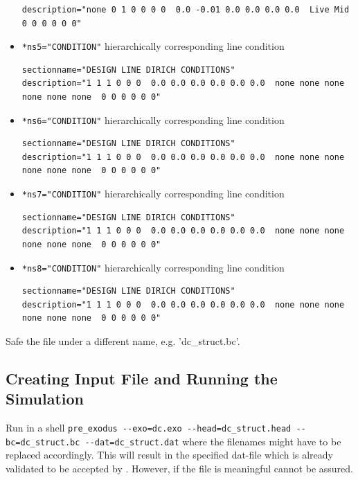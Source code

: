 \begin{itemize}
\begin{small}
\begin{verbatim}
description="none 0 1 0 0 0 0  0.0 -0.01 0.0 0.0 0.0 0.0  Live Mid 0 0 0 0 0 0"
 \end{verbatim} \end{small}
\item \verb|*ns5="CONDITION"| \qquad hierarchically corresponding line condition
 \begin{small} \begin{verbatim}
sectionname="DESIGN LINE DIRICH CONDITIONS"
description="1 1 1 0 0 0  0.0 0.0 0.0 0.0 0.0 0.0  none none none none none none  0 0 0 0 0 0"
 \end{verbatim} \end{small}
\item \verb|*ns6="CONDITION"| \qquad hierarchically corresponding line condition
 \begin{small} \begin{verbatim}
sectionname="DESIGN LINE DIRICH CONDITIONS"
description="1 1 1 0 0 0  0.0 0.0 0.0 0.0 0.0 0.0  none none none none none none  0 0 0 0 0 0"
 \end{verbatim} \end{small}
\item \verb|*ns7="CONDITION"| \qquad hierarchically corresponding line condition
 \begin{small} \begin{verbatim}
sectionname="DESIGN LINE DIRICH CONDITIONS"
description="1 1 1 0 0 0  0.0 0.0 0.0 0.0 0.0 0.0  none none none none none none  0 0 0 0 0 0"
 \end{verbatim} \end{small}
\item \verb|*ns8="CONDITION"| \qquad hierarchically corresponding line condition
 \begin{small} \begin{verbatim}
sectionname="DESIGN LINE DIRICH CONDITIONS"
description="1 1 1 0 0 0  0.0 0.0 0.0 0.0 0.0 0.0  none none none none none none  0 0 0 0 0 0"
 \end{verbatim} \end{small}

\end{itemize}

Safe the file under a different name, e.g. 'dc\_struct.bc'.

\subsection{Creating \baci{} Input File and Running the Simulation}
Run in a shell \verb|pre_exodus --exo=dc.exo --head=dc_struct.head --bc=dc_struct.bc --dat=dc_struct.dat| where the filenames might have to be replaced accordingly. This will result in the specified dat-file which is already validated to be accepted by \baci{}. However, if the file is meaningful cannot be assured.

